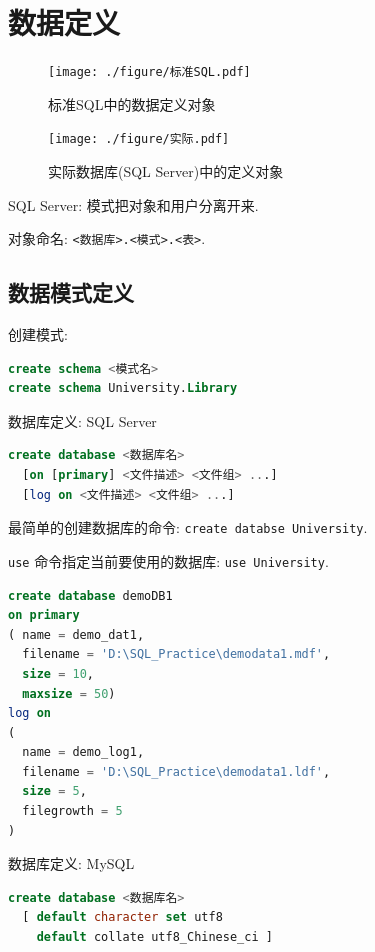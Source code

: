 \section{数据定义}

\begin{figure}[H]
  \centering
  \begin{minipage}[t]{0.45\textwidth}
    \centering
    \texttt{[image: ./figure/标准SQL.pdf]}
    \caption{标准SQL中的数据定义对象}
  \end{minipage}
  \hfill
  \begin{minipage}[t]{0.5\textwidth}
    \centering
    \texttt{[image: ./figure/实际.pdf]}
    \caption{实际数据库(SQL Server)中的定义对象}
  \end{minipage}
\end{figure}

SQL Server: 模式把对象和用户分离开来.

对象命名: \verb|<数据库>.<模式>.<表>|.

\subsection{数据模式定义}

创建模式:
\begin{lstlisting}[language=SQL]
create schema <模式名>
create schema University.Library
\end{lstlisting}

数据库定义: SQL Server
\begin{lstlisting}[language=SQL]
create database <数据库名>
  [on [primary] <文件描述> <文件组> ...]
  [log on <文件描述> <文件组> ...]
\end{lstlisting}

最简单的创建数据库的命令: \verb|create databse University|.

\verb|use| 命令指定当前要使用的数据库: \verb|use University|.

\begin{lstlisting}[language=SQL]
create database demoDB1
on primary
( name = demo_dat1,
  filename = 'D:\SQL_Practice\demodata1.mdf',
  size = 10,
  maxsize = 50)
log on
(
  name = demo_log1,
  filename = 'D:\SQL_Practice\demodata1.ldf',
  size = 5,
  filegrowth = 5
)
\end{lstlisting}

数据库定义: MySQL
\begin{lstlisting}[language=SQL]
create database <数据库名>
  [ default character set utf8
    default collate utf8_Chinese_ci ]
\end{lstlisting}

